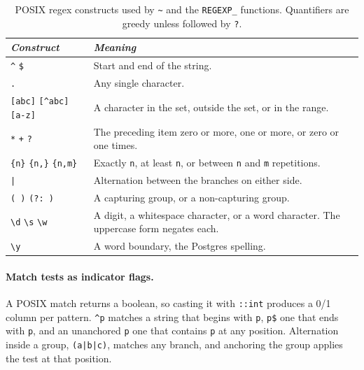 \begin{table}[H]
\centering
\footnotesize
\renewcommand{\arraystretch}{1.4}
\begin{tabularx}{\textwidth}{>{\raggedright\arraybackslash}p{} >{\raggedright\arraybackslash}X}
\toprule
\textit{Construct} & \textit{Meaning} \\
\midrule
\texttt{\^{}} \quad \texttt{\$} & Start and end of the string. \\
\texttt{.} & Any single character. \\
\texttt{[abc]} \quad \texttt{[\^{}abc]} \quad \texttt{[a-z]} & A character in the set, outside the set, or in the range. \\
\texttt{*} \quad \texttt{+} \quad \texttt{?} & The preceding item zero or more, one or more, or zero or one times. \\
\texttt{\{n\}} \quad \texttt{\{n,\}} \quad \texttt{\{n,m\}} & Exactly \texttt{n}, at least \texttt{n}, or between \texttt{n} and \texttt{m} repetitions. \\
\texttt{|} & Alternation between the branches on either side. \\
\texttt{( )} \quad \texttt{(?: )} & A capturing group, or a non-capturing group. \\
\texttt{\textbackslash d} \quad \texttt{\textbackslash s} \quad \texttt{\textbackslash w} & A digit, a whitespace character, or a word character. The uppercase form negates each. \\
\texttt{\textbackslash y} & A word boundary, the Postgres spelling. \\
\bottomrule
\end{tabularx}
\caption*{POSIX regex constructs used by \texttt{\textasciitilde} and the \texttt{REGEXP\_} functions. Quantifiers are greedy unless followed by \texttt{?}.}
\end{table}

\vspace{-2ex}

\paragraph{Match tests as indicator flags.} A POSIX match returns a boolean, so casting it with \texttt{::int} produces a 0/1 column per pattern. \texttt{\^{}p} matches a string that begins with \texttt{p}, \texttt{p\$} one that ends with \texttt{p}, and an unanchored \texttt{p} one that contains \texttt{p} at any position. Alternation inside a group, \texttt{(a|b|c)}, matches any branch, and anchoring the group applies the test at that position.


